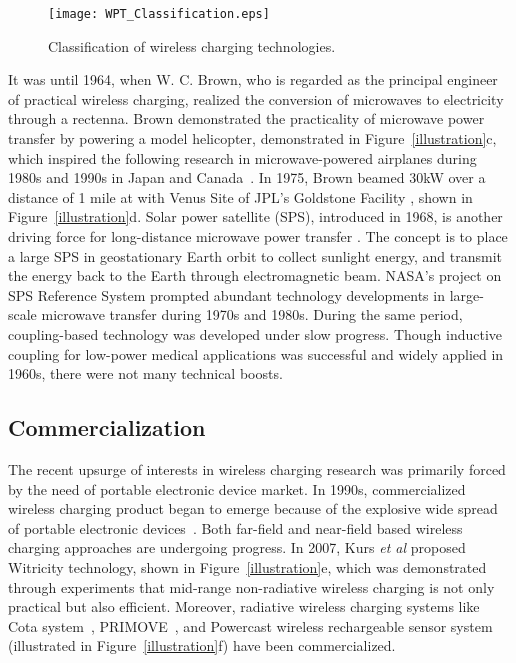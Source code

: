 \documentclass[twocolumn,10pt]{IEEEtran}
\begin{document}
\begin{figure*}
\centering
\texttt{[image: WPT\_Classification.eps]}
\caption{Classification of wireless charging technologies.} \label{WPT_Classification}
\end{figure*}




It was until 1964, when W. C. Brown, who is regarded as the principal engineer of practical wireless charging, realized the conversion of microwaves to electricity through a rectenna.
Brown demonstrated the practicality of microwave power transfer by powering a model helicopter, demonstrated in Figure~\ref{illustration}c, which inspired the following research in microwave-powered airplanes during 1980s and 1990s in Japan and Canada~\cite{J.1988Schlesak}. In 1975, Brown beamed 30kW over a distance of 1 mile at  with Venus Site of JPL’s Goldstone Facility \cite{B.2013Strassner}, shown in Figure~\ref{illustration}d.
Solar power satellite (SPS), introduced in 1968, is another driving force for long-distance microwave power transfer \cite{O.2002McSpadden}. The concept is to place a large SPS in geostationary Earth orbit to collect sunlight energy, and transmit the energy back to the Earth through electromagnetic beam. NASA's project on SPS Reference System prompted abundant technology developments in large-scale microwave transfer during 1970s and 1980s. 
During the same period, coupling-based technology was developed under slow progress. Though inductive coupling for low-power medical applications was successful and widely applied in 1960s, there were not many technical boosts.     

\subsection{Commercialization}

The recent upsurge of interests in wireless charging research was primarily forced by the need of portable electronic device market. In 1990s, commercialized wireless charging product began to emerge because of the explosive wide spread of portable electronic devices~\cite{A.2006Vanderelli}. Both far-field and near-field based wireless charging approaches are undergoing progress. In 2007, Kurs \emph{et al} proposed Witricity technology, shown in Figure~\ref{illustration}e, which was demonstrated through experiments that mid-range non-radiative wireless charging is not only practical but also efficient. Moreover, radiative wireless charging systems like Cota system~\cite{cota_system}, PRIMOVE~\cite{primove}, and Powercast wireless rechargeable sensor system \cite{Powercast} (illustrated in Figure~\ref{illustration}f) have been commercialized.  
\end{document}
